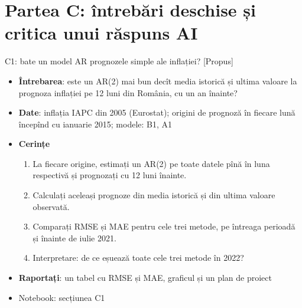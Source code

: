 \section{Partea C: întrebări deschise și critica unui răspuns AI}

\begin{frame}{C1: bate un model AR prognozele simple ale inflației? [Propus]}
\itemsize{\footnotesize}
\begin{itemize}
\item \textbf{Întrebarea}: este un AR(2) mai bun decît media istorică și ultima valoare la prognoza inflației pe 12 luni din România, cu un an înainte?
\item \textbf{Date}: inflația IAPC din 2005 (Eurostat); origini de prognoză în fiecare lună începînd cu ianuarie 2015; modele: B1, A1
\item \textbf{Cerințe}
\begin{enumerate}
    \item La fiecare origine, estimați un AR(2) pe toate datele pînă în luna respectivă și prognozați cu 12 luni înainte.
    \item Calculați aceleași prognoze din media istorică și din ultima valoare observată.
    \item Comparați RMSE și MAE pentru cele trei metode, pe întreaga perioadă și înainte de iulie 2021.
    \item Interpretare: de ce eșuează toate cele trei metode în 2022?
\end{enumerate}
\item \textbf{Raportați}: un tabel cu RMSE și MAE, graficul și un plan de proiect
\item Notebook: secțiunea C1
\end{itemize}
\end{frame}

